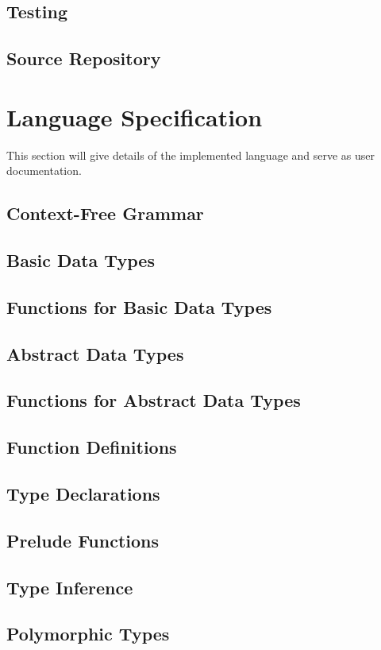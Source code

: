 \documentclass{article}
\begin{document}
\subsection{Testing}
\subsection{Source Repository}

\pagebreak
\section{Language Specification}
This section will give details of the implemented language and serve as user documentation.
\subsection{Context-Free Grammar}
\subsection{Basic Data Types}
\subsection{Functions for Basic Data Types}
\subsection{Abstract Data Types}
\subsection{Functions for Abstract Data Types}
\subsection{Function Definitions}
\subsection{Type Declarations}
\subsection{Prelude Functions}
\subsection{Type Inference}
\subsection{Polymorphic Types}
\end{document}
